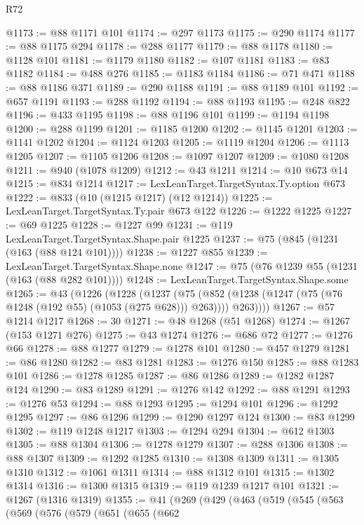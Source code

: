 \begin{lexlean}{R72}
\begin{coremodule}
@1173 := @88 @1171 @101
@1174 := @297 @1173
@1175 := @290 @1174
@1177 := @88 @1175 @294
@1178 := @288 @1177
@1179 := @88 @1178
@1180 := @1128 @101
@1181 := @1179 @1180
@1182 := @107 @1181
@1183 := @83 @1182
@1184 := @488 @276
@1185 := @1183 @1184
@1186 := @71 @471
@1188 := @88 @1186 @371
@1189 := @290 @1188
@1191 := @88 @1189 @101
@1192 := @657 @1191
@1193 := @288 @1192
@1194 := @88 @1193
@1195 := @248 @822
@1196 := @433 @1195
@1198 := @88 @1196 @101
@1199 := @1194 @1198
@1200 := @288 @1199
@1201 := @1185 @1200
@1202 := @1145 @1201
@1203 := @1141 @1202
@1204 := @1124 @1203
@1205 := @1119 @1204
@1206 := @1113 @1205
@1207 := @1105 @1206
@1208 := @1097 @1207
@1209 := @1080 @1208
@1211 := @940 (@1078 @1209)
@1212 := @43 @1211
@1214 := @10 @673 @14
@1215 := @834 @1214
@1217 := LexLeanTarget.TargetSyntax.Ty.option @673
@1222 := @833 (@10 (@1215 @1217) (@12 @1214))
@1225 := LexLeanTarget.TargetSyntax.Ty.pair @673 @122
@1226 := @1222 @1225
@1227 := @69 @1225
@1228 := @1227 @99
@1231 := @119 LexLeanTarget.TargetSyntax.Shape.pair @1225
@1237 := @75 (@845 (@1231 (@163 (@88 @124 @101))))
@1238 := @1227 @855
@1239 := LexLeanTarget.TargetSyntax.Shape.none
@1247 := @75 (@76 @1239 @55 (@1231 (@163 (@88 @282 @101))))
@1248 := LexLeanTarget.TargetSyntax.Shape.some
@1265 := @43
    (@1226
      (@1228
        (@1237
          (@75 (@852 (@1238 (@1247 (@75 (@76 @1248 (@192 @55) (@1053 (@275 @628))) @263)))) @263))))
@1267 := @57 @1214 @1217
@1268 := 30
@1271 := @48 @1268 (@51 @1268)
@1274 := @1267 (@153 @1271 @276)
@1275 := @43 @1274
@1276 := @686 @72
@1277 := @1276 @66
@1278 := @88 @1277
@1279 := @1278 @101
@1280 := @457 @1279
@1281 := @86 @1280
@1282 := @83 @1281
@1283 := @1276 @150
@1285 := @88 @1283 @101
@1286 := @1278 @1285
@1287 := @86 @1286
@1289 := @1282 @1287 @124
@1290 := @83 @1289
@1291 := @1276 @142
@1292 := @88 @1291
@1293 := @1276 @53
@1294 := @88 @1293
@1295 := @1294 @101
@1296 := @1292 @1295
@1297 := @86 @1296
@1299 := @1290 @1297 @124
@1300 := @83 @1299
@1302 := @119 @1248 @1217
@1303 := @1294 @294
@1304 := @612 @1303
@1305 := @88 @1304
@1306 := @1278 @1279
@1307 := @288 @1306
@1308 := @88 @1307
@1309 := @1292 @1285
@1310 := @1308 @1309
@1311 := @1305 @1310
@1312 := @1061 @1311
@1314 := @88 @1312 @101
@1315 := @1302 @1314
@1316 := @1300 @1315
@1319 := @119 @1239 @1217 @101
@1321 := @1267 (@1316 @1319)
@1355 := @41
    (@269
      (@429
        (@463
          (@519
            (@545
              (@563
                (@569
                  (@576
                    (@579
                      (@651
                        (@655
                          (@662

\end{coremodule}
\end{lexlean}
